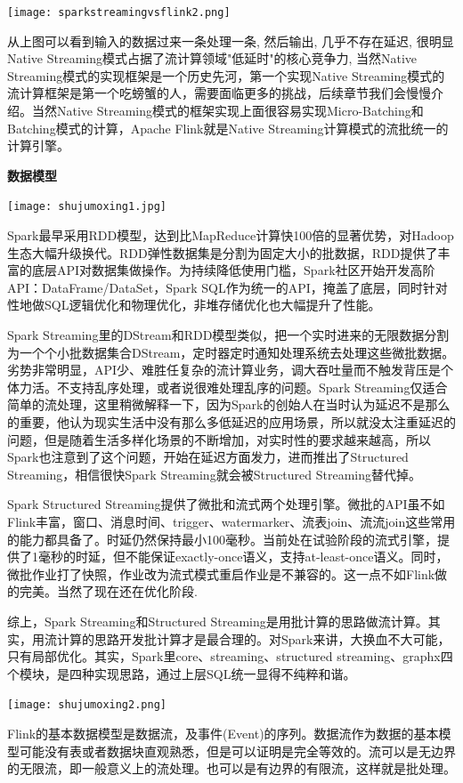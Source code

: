 \documentclass[oneside]{ctexbook}
\begin{document}
\noindent \texttt{[image: sparkstreamingvsflink2.png]}

从上图可以看到输入的数据过来一条处理一条, 然后输出, 几乎不存在延迟, 很明显Native Streaming模式占据了流计算领域"低延时"的核心竞争力, 当然Native Streaming模式的实现框架是一个历史先河，第一个实现Native Streaming模式的流计算框架是第一个吃螃蟹的人，需要面临更多的挑战，后续章节我们会慢慢介绍。当然Native Streaming模式的框架实现上面很容易实现Micro-Batching和Batching模式的计算，Apache Flink就是Native Streaming计算模式的流批统一的计算引擎。

\textbf{数据模型}

\noindent \texttt{[image: shujumoxing1.jpg]}

Spark最早采用RDD模型，达到比MapReduce计算快100倍的显著优势，对Hadoop生态大幅升级换代。RDD弹性数据集是分割为固定大小的批数据，RDD提供了丰富的底层API对数据集做操作。为持续降低使用门槛，Spark社区开始开发高阶API：DataFrame/DataSet，Spark SQL作为统一的API，掩盖了底层，同时针对性地做SQL逻辑优化和物理优化，非堆存储优化也大幅提升了性能。

Spark Streaming里的DStream和RDD模型类似，把一个实时进来的无限数据分割为一个个小批数据集合DStream，定时器定时通知处理系统去处理这些微批数据。劣势非常明显，API少、难胜任复杂的流计算业务，调大吞吐量而不触发背压是个体力活。不支持乱序处理，或者说很难处理乱序的问题。Spark Streaming仅适合简单的流处理，这里稍微解释一下，因为Spark的创始人在当时认为延迟不是那么的重要，他认为现实生活中没有那么多低延迟的应用场景，所以就没太注重延迟的问题，但是随着生活多样化场景的不断增加，对实时性的要求越来越高，所以Spark也注意到了这个问题，开始在延迟方面发力，进而推出了Structured Streaming，相信很快Spark Streaming就会被Structured Streaming替代掉。

Spark Structured Streaming提供了微批和流式两个处理引擎。微批的API虽不如Flink丰富，窗口、消息时间、trigger、watermarker、流表join、流流join这些常用的能力都具备了。时延仍然保持最小100毫秒。当前处在试验阶段的流式引擎，提供了1毫秒的时延，但不能保证exactly-once语义，支持at-least-once语义。同时，微批作业打了快照，作业改为流式模式重启作业是不兼容的。这一点不如Flink做的完美。当然了现在还在优化阶段.

综上，Spark Streaming和Structured Streaming是用批计算的思路做流计算。其实，用流计算的思路开发批计算才是最合理的。对Spark来讲，大换血不大可能，只有局部优化。其实，Spark里core、streaming、structured streaming、graphx四个模块，是四种实现思路，通过上层SQL统一显得不纯粹和谐。

\noindent \texttt{[image: shujumoxing2.png]}

Flink的基本数据模型是数据流，及事件(Event)的序列。数据流作为数据的基本模型可能没有表或者数据块直观熟悉，但是可以证明是完全等效的。流可以是无边界的无限流，即一般意义上的流处理。也可以是有边界的有限流，这样就是批处理。
\end{document}
